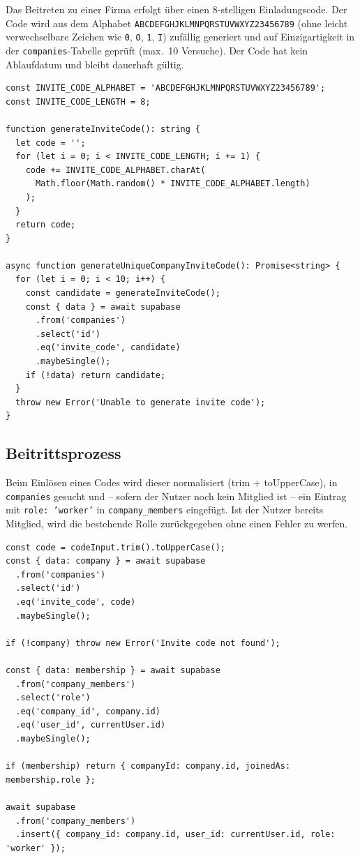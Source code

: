 Das Beitreten zu einer Firma erfolgt über einen 8-stelligen Einladungscode. Der Code
wird aus dem Alphabet \texttt{ABCDEFGHJKLMNPQRSTUVWXYZ23456789} (ohne leicht
verwechselbare Zeichen wie \texttt{0}, \texttt{O}, \texttt{1}, \texttt{I}) zufällig generiert und auf
Einzigartigkeit in der \texttt{companies}-Tabelle geprüft (max.\ 10 Versuche). Der Code hat
kein Ablaufdatum und bleibt dauerhaft gültig.

\begin{lstlisting}[style=skyline-ts,caption={Generierung eindeutigen Invite-Codes (Auszug companyService.ts)},label={lst:invite_code}]
const INVITE_CODE_ALPHABET = 'ABCDEFGHJKLMNPQRSTUVWXYZ23456789';
const INVITE_CODE_LENGTH = 8;

function generateInviteCode(): string {
  let code = '';
  for (let i = 0; i < INVITE_CODE_LENGTH; i += 1) {
    code += INVITE_CODE_ALPHABET.charAt(
      Math.floor(Math.random() * INVITE_CODE_ALPHABET.length)
    );
  }
  return code;
}

async function generateUniqueCompanyInviteCode(): Promise<string> {
  for (let i = 0; i < 10; i++) {
    const candidate = generateInviteCode();
    const { data } = await supabase
      .from('companies')
      .select('id')
      .eq('invite_code', candidate)
      .maybeSingle();
    if (!data) return candidate;
  }
  throw new Error('Unable to generate invite code');
}
\end{lstlisting}

\subsection{Beitrittsprozess}

Beim Einlösen eines Codes wird dieser normalisiert (trim + toUpperCase), in
\texttt{companies} gesucht und -- sofern der Nutzer noch kein Mitglied ist -- ein Eintrag
mit \texttt{role: 'worker'} in \texttt{company\_members} eingefügt. Ist der Nutzer bereits
Mitglied, wird die bestehende Rolle zurückgegeben ohne einen Fehler zu werfen.

\begin{lstlisting}[style=skyline-ts,caption={Beitritt per Invite-Code (Auszug companyService.ts)},label={lst:join_invite}]
const code = codeInput.trim().toUpperCase();
const { data: company } = await supabase
  .from('companies')
  .select('id')
  .eq('invite_code', code)
  .maybeSingle();

if (!company) throw new Error('Invite code not found');

const { data: membership } = await supabase
  .from('company_members')
  .select('role')
  .eq('company_id', company.id)
  .eq('user_id', currentUser.id)
  .maybeSingle();

if (membership) return { companyId: company.id, joinedAs: membership.role };

await supabase
  .from('company_members')
  .insert({ company_id: company.id, user_id: currentUser.id, role: 'worker' });
\end{lstlisting}

